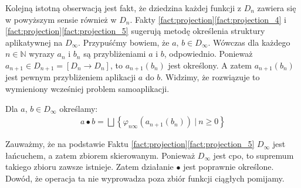 Kolejną istotną obserwacją jest fakt, że dziedzina każdej funkcji z \(D_n\) zawiera się w powyższym sensie również w \(D_n\). Fakty \ref{fact:projection}\ref{fact:projection_4} i \ref{fact:projection}\ref{fact:projection_5} sugerują metodę określenia struktury aplikatywnej na \(D_\infty\). Przypuśćmy bowiem, że \(a,\,b\in D_\infty\). Wówczas dla każdego \(n\in\mathbb{N}\) wyrazy \(a_n\) i \(b_n\) są przybliżeniami \(a\) i \(b\), odpowiednio. Ponieważ \(a_{n+1}\in  D_{n+1}=[D_n\to D_n]\), to \(a_{n+1}(b_n)\) jest określony. A zatem \(a_{n+1}(b_n)\) jest pewnym przybliżeniem aplikacji \(a\) do \(b\). Widzimy, że rozwiązuje to wymieniony wcześniej problem samoaplikacji. 

\begin{definicja}%
  Dla \(a,\,b\in D_\infty\) określamy:
\begin{align*}
a \bullet b = \bigsqcup\left\{\varphi_{n\infty}(a_{n+1}(b_n))\ |\ n\geq 0\right\}%
\end{align*}
\end{definicja}

Zauważmy, że na podstawie Faktu \ref{fact:projection}\ref{fact:projection_5} \(D_\infty\) jest łańcuchem, a zatem zbiorem skierowanym. Ponieważ \(D_\infty\) jest cpo, to supremum takiego zbioru zawsze istnieje. Zatem działanie \(\bullet\) jest poprawnie określone.
Dowód, że operacja ta nie wyprowadza poza zbiór funkcji ciągłych pomijamy. 



